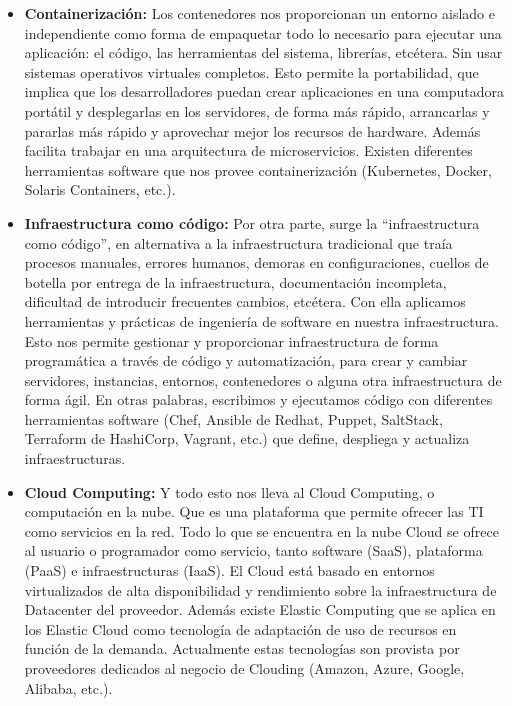 \begin{itemize}
\item \textbf{Containerización:} Los contenedores nos proporcionan un entorno aislado e independiente como forma de empaquetar todo lo necesario para ejecutar una aplicación: el código, las herramientas del sistema, librerías, etcétera. Sin usar sistemas operativos virtuales completos. Esto permite la portabilidad, que implica que los desarrolladores puedan crear aplicaciones en una computadora portátil y desplegarlas en los servidores, de forma más rápido, arrancarlas y pararlas más rápido y aprovechar mejor los recursos de hardware. Además facilita trabajar en una arquitectura de microservicios. Existen diferentes herramientas software que nos provee containerización (Kubernetes, Docker, Solaris Containers, etc.).

\item \textbf{Infraestructura como código:} Por otra parte, surge la “infraestructura como código”, en alternativa a la infraestructura tradicional que traía procesos manuales, errores humanos, demoras en configuraciones, cuellos de botella por entrega de la infraestructura, documentación incompleta, dificultad de introducir frecuentes cambios, etcétera. Con ella aplicamos herramientas y prácticas de ingeniería de software en nuestra infraestructura. Esto nos permite gestionar y proporcionar infraestructura de forma programática a través de código y automatización, para crear y cambiar servidores, instancias, entornos, contenedores o alguna otra infraestructura de forma ágil. En otras palabras, escribimos y ejecutamos código con diferentes herramientas software (Chef, Ansible de Redhat, Puppet, SaltStack, Terraform de HashiCorp, Vagrant, etc.) que define, despliega y actualiza infraestructuras.

\item \textbf{Cloud Computing:} Y todo esto nos lleva al Cloud Computing, o computación en la nube. Que es una plataforma que permite ofrecer las TI como servicios en la red. Todo lo que se encuentra en la nube Cloud se ofrece al usuario o programador como servicio, tanto software (SaaS), plataforma (PaaS) e infraestructuras (IaaS). El Cloud está basado en entornos virtualizados de alta disponibilidad y rendimiento sobre la infraestructura de Datacenter del proveedor. Además existe Elastic Computing que se aplica en los Elastic Cloud como tecnología de adaptación de uso de recursos en función de la demanda. Actualmente estas tecnologías son provista por proveedores dedicados al negocio de Clouding (Amazon, Azure, Google, Alibaba, etc.).

\end{itemize}

